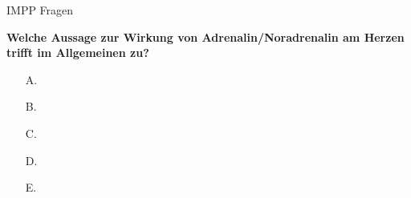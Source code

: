 \documentclass{beamer}
\begin{document}

 







\begin{frame}{IMPP Fragen}


\textbf{ Welche Aussage zur Wirkung von Adrenalin/Noradrenalin am Herzen trifft im Allgemeinen zu?} \\[0.2 cm]

\begin{itemize}
\item[A.] 
\item[B.] 
\item[C.] 
\item[D.] 
\item[E.] 

\end{itemize}

    
\end{frame}





\section{}

\end{document}
